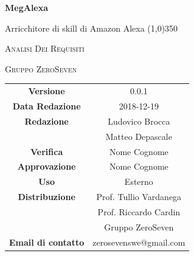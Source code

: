 \documentclass[a4paper,12pt]{book}
\author{Ludovico Brocca}
\date{2018-12-19}
\begin{document}
\begin{titlepage}
	\centering
	{\huge\bfseries MegAlexa\par}
	Arricchitore di skill di Amazon Alexa
	\line(1,0){350} \\
	{\scshape\LARGE Analisi Dei Requisiti \par}
	\vspace{1cm}
	{\scshape Gruppo ZeroSeven \par}
	\logo
	\begin{tabular}{c|c}
		{\hfill \textbf{Versione}} 			& 0.0.1				\\
		{\hfill\textbf{Data Redazione}} 	& 2018-12-19		\\ 
		{\hfill\textbf{Redazione}} 			&  		Ludovico Brocca \\ & Matteo Depascale	\\	
		{\hfill\textbf{Verifica}} 				&  	Nome Cognome			\\ 
		{\hfill\textbf{Approvazione}} 		&  		Nome Cognome			\\ 
		{\hfill\textbf{Uso}} 					& 		Esterno		\\ 
		{\hfill\textbf{Distribuzione}} 			& 			Prof. Tullio Vardanega \\ & Prof. Riccardo Cardin \\ & Gruppo ZeroSeven		\\ 
		{\hfill\textbf{Email di contatto}} & zerosevenswe@gmail.com \\
	\end{tabular}
\end{titlepage}
	

	
	\label{LastFrontPage}
	\newpage	
	
	\pagestyle{mymain}
	\tableofcontents
	
	

	
	\label{LastPage}
\end{document}
